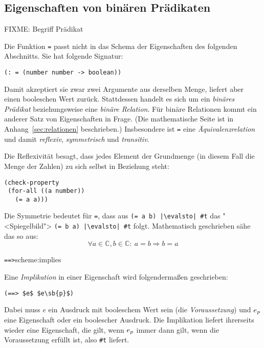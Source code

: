 \subsection{Eigenschaften von binären Prädikaten}

FIXME: Begriff Prädikat

Die Funktion \lstinline{=} passt nicht in das Schema der Eigenschaften
des folgenden Abschnitts.  Sie hat folgende Signatur:
%
\begin{lstlisting}
(: = (number number -> boolean))
\end{lstlisting}
%
Damit akzeptiert sie zwar zwei Argumente aus derselben Menge, liefert
aber einen booleschen Wert zurück.  Stattdessen handelt es sich um ein
\textit{binäres Prädikat} beziehungsweise eine \textit{binäre
  Relation}.  Für binäre
Relationen kommt ein anderer Satz von Eigenschaften in Frage.  (Die
mathematische Seite ist in Anhang~\ref{sec:relationen} beschrieben.)
Insbesondere ist \lstinline{=} eine
\textit{Äquivalenzrelation} und damit
\textit{reflexiv},
\textit{symmetrisch} und
\textit{transitiv}.

Die Reflexivität besagt, dass jedes Element der Grundmenge (in diesem
Fall die Menge der Zahlen) zu sich selbst in Beziehung steht:
%
\begin{lstlisting}
(check-property
 (for-all ((a number))
   (= a a)))
\end{lstlisting}
%
Die Symmetrie bedeutet für \lstinline{=}, dass aus
\lstinline{(= a b) |\evalsto| #t} das "<Spiegelbild">
\lstinline{(= b a) |\evalsto| #t}
folgt.  Mathematisch geschrieben sähe das so aus:
%
\begin{displaymath}
  \forall a \in \mathbb{C}, b\in\mathbb{C}:\ a = b \Rightarrow b = a
\end{displaymath}
%
\begin{feature}{\lstinline{==>}}{scheme:implies}

Eine \textit{Implikation} in einer Eigenschaft wird
folgendermaßen geschrieben:
\begin{lstlisting}
(==> $e$ $e\sb{p}$)
\end{lstlisting}
%
Dabei muss $e$ ein Ausdruck mit booleschem Wert sein (die
\textit{Voraussetzung}) und $e\sb{p}$ eine Eigenschaft oder ein
boolescher Ausdruck.  Die Implikation liefert ihrerseits wieder eine
Eigenschaft, die gilt, wenn $e\sb{p}$ immer dann gilt, wenn die
Voraussetzung erfüllt ist, also \lstinline{#t} liefert.
\end{feature}

